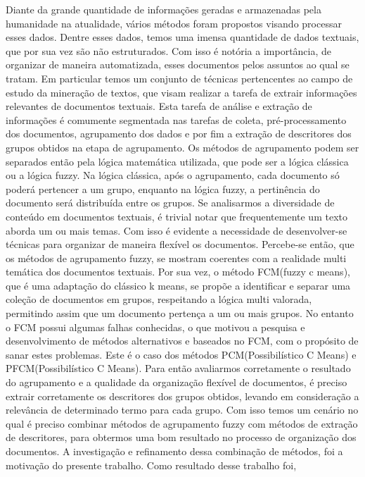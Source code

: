 Diante da grande quantidade de informações geradas e armazenadas pela humanidade na atualidade, 
vários métodos foram propostos visando processar esses dados. Dentre esses dados, temos uma imensa
quantidade de dados textuais, que por sua vez são não estruturados. Com isso é notória a importância,
de organizar de maneira automatizada, esses documentos pelos assuntos ao qual se tratam. Em particular temos um conjunto de técnicas pertencentes ao campo de estudo da mineração de textos, que visam realizar a tarefa de extrair informações relevantes de documentos textuais. Esta tarefa de análise e extração de informações é 
comumente segmentada nas tarefas de coleta, pré-processamento dos documentos, agrupamento dos dados
e por fim a extração de descritores dos grupos obtidos na etapa de agrupamento. Os métodos de agrupamento podem ser separados então pela lógica matemática utilizada, que pode ser a lógica clássica ou a lógica fuzzy. Na lógica clássica, após o agrupamento, cada documento só poderá pertencer a um grupo, enquanto na lógica fuzzy, a pertinência do documento será distribuída entre os grupos. 
Se analisarmos a diversidade de conteúdo em documentos textuais, é trivial notar que frequentemente
um texto aborda um ou mais temas. Com isso é evidente a necessidade de desenvolver-se técnicas para
organizar de maneira flexível os documentos. Percebe-se então, que os métodos de agrupamento fuzzy,
se mostram coerentes com a realidade multi temática dos documentos textuais. Por sua vez, o método FCM(fuzzy c means), que é uma adaptação do clássico k means, se propõe a identificar e separar uma coleção de documentos em grupos, respeitando a lógica multi valorada, permitindo assim que um documento pertença a um ou mais grupos. No entanto o FCM possui algumas falhas conhecidas, o que motivou a pesquisa e desenvolvimento de métodos alternativos e baseados no FCM, com o propósito de sanar estes problemas. Este é o caso dos métodos PCM(Possibilístico C Means) e PFCM(Possibilístico C Means). 
Para então avaliarmos corretamente o resultado do agrupamento e a qualidade da organização flexível 
de documentos, é preciso extrair corretamente os descritores dos grupos obtidos, levando em 
consideração a relevância de determinado termo para cada grupo. Com isso temos um cenário no qual é 
preciso combinar métodos de agrupamento fuzzy com métodos de extração de descritores, para obtermos
uma bom resultado no processo de organização dos documentos. A investigação e refinamento dessa 
combinação de métodos, foi a motivação do presente trabalho. Como resultado desse trabalho foi,
